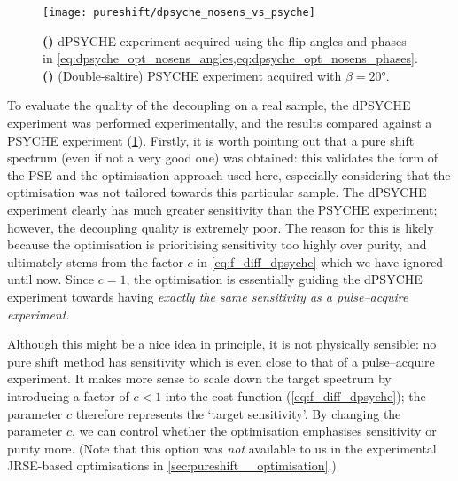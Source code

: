 \begin{figure}[htb]
    \centering
    \texttt{[image: pureshift/dpsyche\_nosens\_vs\_psyche]}%
    {\label{fig:dpsyche_nosens_vs_psyche_dp}}%
    {\label{fig:dpsyche_nosens_vs_psyche_p}}%
    \caption[Comparison of optimised dPSYCHE and PSYCHE]{
        \textbf{()} dPSYCHE experiment acquired using the flip angles and phases in \cref{eq:dpsyche_opt_nosens_angles,eq:dpsyche_opt_nosens_phases}.
        \textbf{()} (Double-saltire) PSYCHE experiment acquired with $\beta = \ang{20}$.
    }
    \label{fig:dpsyche_nosens_vs_psyche}
\end{figure}

To evaluate the quality of the decoupling on a real sample, the dPSYCHE experiment was performed experimentally, and the results compared against a PSYCHE experiment (\cref{fig:dpsyche_nosens_vs_psyche}).
Firstly, it is worth pointing out that a pure shift spectrum (even if not a very good one) was obtained: this validates the form of the PSE and the optimisation approach used here, especially considering that the optimisation was not tailored towards this particular sample.
The dPSYCHE experiment clearly has much greater sensitivity than the PSYCHE experiment; however, the decoupling quality is extremely poor.
The reason for this is likely because the optimisation is prioritising sensitivity too highly over purity, and ultimately stems from the factor $c$ in \cref{eq:f_diff_dpsyche} which we have ignored until now.
Since $c = 1$, the optimisation is essentially guiding the dPSYCHE experiment towards having \textit{exactly the same sensitivity as a pulse--acquire experiment}.

Although this might be a nice idea in principle, it is not physically sensible: no pure shift method has sensitivity which is even close to that of a pulse--acquire experiment.
It makes more sense to scale down the target spectrum by introducing a factor of $c < 1$ into the cost function (\cref{eq:f_diff_dpsyche}); the parameter $c$ therefore represents the `target sensitivity'.
By changing the parameter $c$, we can control whether the optimisation emphasises sensitivity or purity more.
(Note that this option was \textit{not} available to us in the experimental JRSE-based optimisations in \cref{sec:pureshift__optimisation}.)

